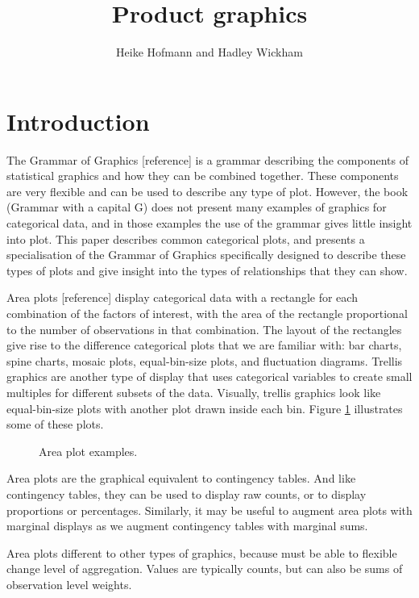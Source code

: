 \documentclass[letterpaper,oneside]{scrartcl}
\title{Product graphics}
\author{Heike Hofmann and Hadley Wickham}
\begin{document}
\maketitle
  
\section{Introduction}


The Grammar of Graphics [reference] is a grammar describing the components of statistical graphics and how they can be combined together.  These components are very flexible and can be used to describe any type of plot.  However, the book (Grammar with a capital G) does not present many examples of graphics for categorical data, and in those examples the use of the grammar gives little insight into plot.  This paper describes common categorical plots, and presents a specialisation of the Grammar of Graphics specifically designed to describe these types of plots and give insight into the types of relationships that they can show.  

Area plots [reference] display categorical data with a rectangle for each combination of the factors of interest, with the area of the rectangle proportional to the number of observations in that combination.  The layout of the rectangles give rise to the difference categorical plots that we are familiar with: bar charts, spine charts, mosaic plots, equal-bin-size plots, and fluctuation diagrams.  Trellis graphics are another type of display that uses categorical variables to create small multiples for different subsets of the data.  Visually, trellis graphics look like equal-bin-size plots with another plot drawn inside each bin.  Figure \ref{fig:cat-examples} illustrates some of these plots.

\begin{figure}[htbp]
  \begin{center}
  \end{center}
  \caption{Area plot examples.}
  \label{fig:cat-examples}
\end{figure}

Area plots are the graphical equivalent to contingency tables.  And like contingency tables, they can be used to display raw counts, or to display proportions or percentages.  Similarly, it may be useful to augment area plots with marginal displays as we augment contingency tables with marginal sums.

Area plots different to other types of graphics, because must be able to flexible change level of aggregation.  Values are typically counts, but can also be sums of observation level weights.
\end{document}
